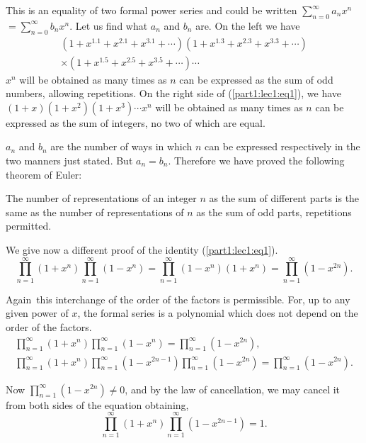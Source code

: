 This is an equality of two formal power series and could be written
$\sum\limits_{n=0}^\infty a_n x^n$ $=\sum\limits_{n=0}^\infty b_n
x^n$. Let us find what $a_n$ and $b_n$ are. On the left we have
\begin{multline*}
  (1+x^{1.1} + x^{2.1}+ x^{3.1}+ \cdots)(1+x^{1.3}+ x^{2.3} + x^{3.3}+
  \cdots)\\ 
  \times (1+x^{1.5} + x^{2.5} + x^{3.5}+ \cdots) \cdots
\end{multline*}
$x^n$ will be obtained as many times as $n$ can be expressed as the
sum of odd numbers, allowing repetitions. On the right side of
(\ref{part1:lec1:eq1}), we
have $(1+x)(1+x^2)(1+x^3)\cdots x^n$ will be obtained as many times as
$n$ can be expressed as the sum of integers, no two of which are
equal.

$a_n$ and $b_n$ are the number of ways in which $n$ can be expressed
respectively in the two manners just stated. But $a_n=b_n$. Therefore
we have proved the following theorem of Euler:

\begin{thm} \label{part1:lec1:thm1} 
  The number of representations of an integer $n$ as the sum of
  different parts is the same as the number of representations of $n$
  as the sum of odd parts, repetitions permitted.
\end{thm}

We give now a different proof of the identity (\ref{part1:lec1:eq1}).
$$
\prod\limits_{n=1}^\infty (1+x^n) \prod\limits_{n=1}^\infty (1-x^n)=
\prod\limits_{n=1}^\infty (1-x^n)(1+x^n)= \prod\limits_{n=1}^\infty (1-x^{2n}). 
$$

Again\pageoriginale\  this interchange of the order of the factors is
permissible. For, up to any given power of $x$, the formal series is a
polynomial which does not depend on the order of the factors.
\begin{multline*}
  \prod\limits_{n=1}^\infty (1+x^n) \prod\limits_{n=1}^\infty (1-x^n)
   = \prod\limits_{n=1}^\infty (1-x^{2n}),\\
  \prod\limits_{n=1}^\infty (1+x^n) \prod\limits_{n=1}^\infty (1-x^{2n-1})
  \prod\limits_{n=1}^\infty (1-x^{2n})= \prod\limits_{n=1}^\infty (1-x^{2n}). 
\end{multline*}

Now $\prod\limits_{n=1}^\infty (1-x^{2n}) \neq 0$, and by the law of
cancellation, we may cancel it from both sides of the equation
obtaining,
$$
\prod\limits_{n=1}^\infty (1+x^{n}) \prod\limits_{n=1}^\infty (1-x^{2n-1})=1.
$$

